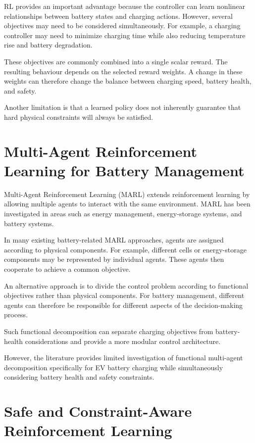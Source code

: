 RL provides an important advantage because the controller can learn
nonlinear relationships between battery states and charging actions.
However, several objectives may need to be considered simultaneously.
For example, a charging controller may need to minimize charging time
while also reducing temperature rise and battery degradation.

These objectives are commonly combined into a single scalar reward.
The resulting behaviour depends on the selected reward weights. A
change in these weights can therefore change the balance between
charging speed, battery health, and safety.

Another limitation is that a learned policy does not inherently
guarantee that hard physical constraints will always be satisfied.

\section{Multi-Agent Reinforcement Learning for Battery Management}

Multi-Agent Reinforcement Learning (MARL) extends reinforcement
learning by allowing multiple agents to interact with the same
environment. MARL has been investigated in areas such as energy
management, energy-storage systems, and battery systems.

In many existing battery-related MARL approaches, agents are assigned
according to physical components. For example, different cells or
energy-storage components may be represented by individual agents.
These agents then cooperate to achieve a common objective.

An alternative approach is to divide the control problem according to
functional objectives rather than physical components. For battery
management, different agents can therefore be responsible for
different aspects of the decision-making process.

Such functional decomposition can separate charging objectives from
battery-health considerations and provide a more modular control
architecture.

However, the literature provides limited investigation of functional
multi-agent decomposition specifically for EV battery charging while
simultaneously considering battery health and safety constraints.

\section{Safe and Constraint-Aware Reinforcement Learning}

